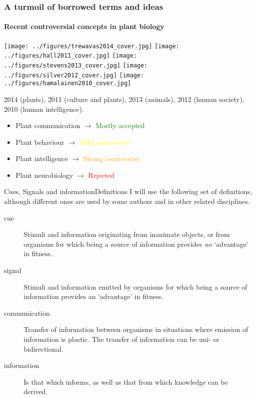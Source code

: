 \documentclass[10pt]{beamer}
\begin{document}
\begin{frame}[t]
\frametitle{A turmoil of borrowed terms and ideas}
\framesubtitle{Recent controversial concepts in plant biology}
\vspace{-5mm}
\begin{center}
\texttt{[image: ../figures/trewavas2014\_cover.jpg]}\hspace{3mm}
\texttt{[image: ../figures/hall2011\_cover.jpg]}\hspace{3mm}
\texttt{[image: ../figures/stevens2013\_cover.jpg]}\hspace{3mm}
\texttt{[image: ../figures/silver2012\_cover.jpg]}\hspace{3mm}
\texttt{[image: ../figures/hamalainen2010\_cover.jpg]}
\end{center}

\nocite{Silver2012,Trewavas2014,Hall2011,Stevens2013,Hamalainen2010}
\noindent
\begin{tiny}
\begin{center}
2014 (plants), 2011 (culture and plants), 2013 (animals), 2012 (human society), 2010 (human intelligence).
\end{center}
\end{tiny}

\pause
\begin{itemize}
\item<2,6> Plant communication $\rightarrow$ \textcolor{green}{Mostly accepted}
\item<3,6> Plant behaviour $\rightarrow$ \textcolor{yellow}{Mild controversy}
\item<4,6> Plant intelligence $\rightarrow$ \textcolor{orange}{Strong controversy}
\item<5,6> Plant neurobiology $\rightarrow$ \textcolor{red}{Rejected}
\end{itemize}

\end{frame}

\begin{frame}{Cues, Signals and information}{Definitions}
I will use the following set of definitions, although different ones are used by some authors and in other related disciplines.
  \begin{description}
     \item[cue] Stimuli and information originating from inanimate objects, or from organisms for which being a source of information provides \emph{no} `advantage' in fitness.
     \item[signal] Stimuli and information emitted by organisms for which being a source of information provides an `advantage' in fitness.
     \item[communication] Transfer of information between organisms in situations where emission of information is plastic. The transfer of information can be uni- or bidirectional.
     \item[information] Is that which informs, as well as that from which knowledge can be derived.
  \end{description}
\end{frame}
\end{document}
